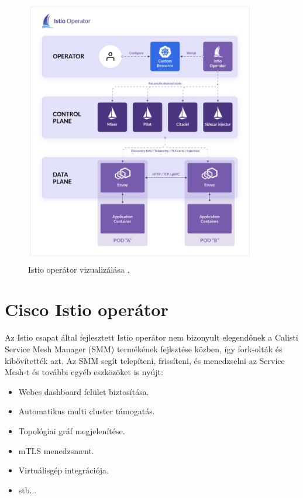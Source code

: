 \begin{figure}[ht]
    \centering
         \includegraphics[width=0.9\textwidth]{figures/kubernetes/operator-overview.png}
          \caption{Istio operátor vizualizálása \cite{banzaicloudOp}.}
           \label{operator-overview}
\end{figure}

\section*{Cisco Istio operátor}
Az Istio csapat által fejlesztett Istio operátor nem bizonyult elegendőnek a Calisti Service Mesh Manager (SMM) termékének fejlsztése közben, így fork-olták és kibővítették azt.
Az SMM segít telepíteni, frissíteni, és menedzselni az Service Mesh-t és további egyéb eszközöket is nyújt:
\begin{itemize}
    \item Webes dashboard felület biztosítása.
    \item Automatikus multi cluster támogatás.
    \item Topológiai gráf megjelenítése.
    \item mTLS menedzsment.
    \item Virtuálisgép integrációja.
    \item stb...
\end{itemize}

